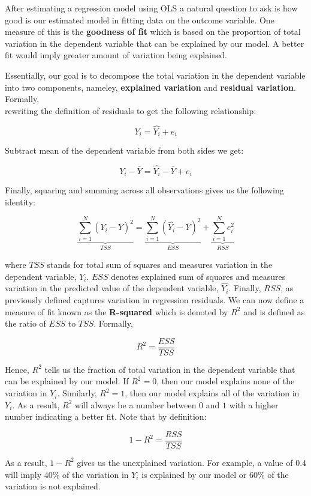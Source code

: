 \documentclass[
]{book}
\theoremstyle{definition}
\theoremstyle{definition}
\theoremstyle{definition}
\theoremstyle{definition}
\theoremstyle{remark}
\begin{document}
After estimating a regression model using OLS a natural question to ask is how good is our estimated model in fitting data on the outcome variable. One measure of this is the \textbf{goodness of fit} which is based on the proportion of total variation in the dependent variable that can be explained by our model. A better fit would imply greater amount of variation being explained.

Essentially, our goal is to decompose the total variation in the dependent variable into two components, nameley, \textbf{explained variation} and \textbf{residual variation}. Formally,\\
rewriting the definition of residuals to get the following relationship:

\[Y_i = \hat{Y_i}+ e_i\]

Subtract mean of the dependent variable from both sides we get:

\[Y_i-\overline{Y} = \hat{Y_i}-\overline{Y}+ e_i\]

Finally, squaring and summing across all observations gives us the following identity:

\[\underbrace{\sum_{i=1}^N (Y_i-\overline{Y})^2}_{TSS}=\underbrace{\sum_{i=1}^N (\hat{Y_i}-\overline{Y})^2}_{ESS}+\underbrace{\sum_{i=1}^N e_i^2}_{RSS}\]

where \(TSS\) stands for total sum of squares and measures variation in the dependent variable, \(Y_i\). \(ESS\) denotes explained sum of squares and measures variation in the predicted value of the dependent variable, \(\hat{Y_i}\). Finally, \(RSS\), as previously defined captures variation in regression residuals. We can now define a measure of fit known as the \textbf{R-squared} which is denoted by \(R^2\) and is defined as the ratio of \(ESS\) to \(TSS\). Formally,

\[R^2=\frac{ESS}{TSS}\]

Hence, \(R^2\) tells us the fraction of total variation in the dependent variable that can be explained by our model. If \(R^2=0\), then our model explains none of the variation in \(Y_i\). Similarly, \(R^2=1\), then our model explains all of the variation in \(Y_i\). As a result, \(R^2\) will always be a number between \(0\) and \(1\) with a higher number indicating a better fit. Note that by definition:

\[1-R^2= \frac{RSS}{TSS}\]

As a result, \(1-R^2\) gives us the unexplained variation. For example, a value of 0.4 will imply 40\% of the variation in \(Y_i\) is explained by our model or 60\% of the variation is not explained.
\end{document}
